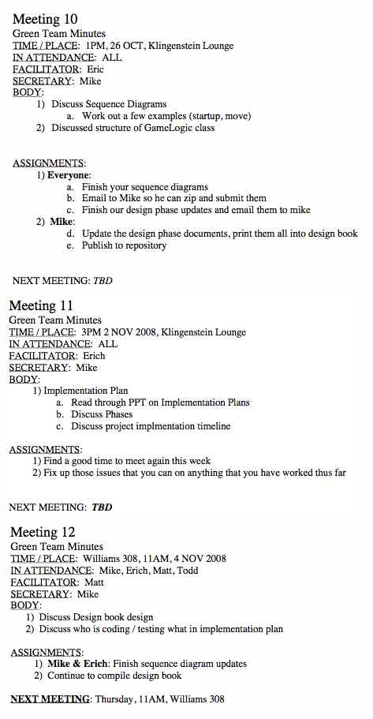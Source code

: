 \begin{flushleft}
	\newpage
	\includegraphics{../DesignDocumentation/Minutes/Minutes_10.jpg}
	\newpage
	\includegraphics{../DesignDocumentation/Minutes/Minutes_11.jpg}
	\newpage
	\includegraphics{../DesignDocumentation/Minutes/Minutes_12.jpg}
	\newpage

\end{flushleft}
